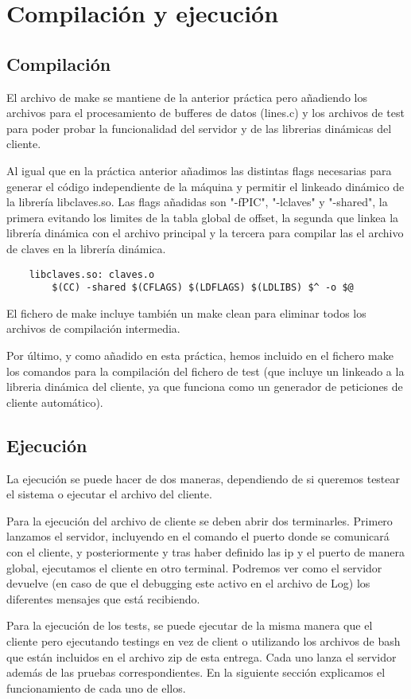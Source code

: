 \section{Compilación y ejecución}
\subsection{Compilación}
El archivo de make se mantiene de la anterior práctica pero añadiendo los archivos para el procesamiento de bufferes de datos (lines.c) y los archivos de test para poder probar la funcionalidad del servidor y de las librerias dinámicas del cliente.

Al igual que en la práctica anterior añadimos las distintas flags necesarias para generar el código independiente de la máquina y permitir el linkeado dinámico de la librería libclaves.so. Las flags añadidas son "-fPIC", "-lclaves" y "-shared", la primera evitando los limites de la tabla global de offset, la segunda que linkea la librería dinámica con el archivo principal y la tercera para compilar las el archivo de claves en la librería dinámica.

\begin{lstlisting}
    libclaves.so: claves.o
        $(CC) -shared $(CFLAGS) $(LDFLAGS) $(LDLIBS) $^ -o $@
\end{lstlisting}

El fichero de make incluye también un make clean para eliminar todos los archivos de compilación intermedia.

Por último, y como añadido en esta práctica, hemos incluido en el fichero make los comandos para la compilación del fichero de test (que incluye un linkeado a la libreria dinámica del cliente, ya que funciona como un generador de peticiones de cliente automático). 

\subsection{Ejecución}
La ejecución se puede hacer de dos maneras, dependiendo de si queremos testear el sistema o ejecutar el archivo del cliente. 

Para la ejecución del archivo de cliente se deben abrir dos terminarles. Primero lanzamos el servidor, incluyendo en el comando el puerto donde se comunicará con el cliente, y posteriormente y tras haber definido las ip y el puerto de manera global, ejecutamos el cliente en otro terminal. Podremos ver como el servidor devuelve (en caso de que el debugging este activo en el archivo de Log) los diferentes mensajes que está recibiendo.

Para la ejecución de los tests, se puede ejecutar de la misma manera que el cliente pero ejecutando testings en vez de client o utilizando los archivos de bash que están incluidos en el archivo zip de esta entrega. Cada uno lanza el servidor además de las pruebas correspondientes. En la siguiente sección explicamos el funcionamiento de cada uno de ellos.
